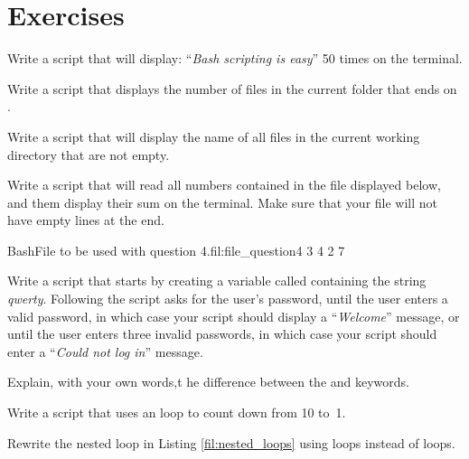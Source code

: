 \section*{Exercises}
\begin{exercises}
  \item Write a script that will display: ``\textit{Bash scripting is easy}'' 50 times on the terminal.
  \item Write a script that displays the number of files in the current folder that ends on .
  \item Write a script that will display the name of all  files in the current working directory that are not empty.
  \item Write a script that will read all numbers contained in the file displayed below, and them display their sum on the terminal. Make sure that your file will not have empty lines at the end.
  \begin{source_code_float}{Bash}{File to be used with question 4.}{fil:file_question4}
3
4
2
7
\end{source_code_float}
  \item Write a script that starts by creating a variable called  containing the string \textit{qwerty}. Following the script asks for the user's password, until the user enters a valid password, in which case your script should display a ``\textit{Welcome}'' message, or until the user enters three invalid passwords, in which case your script should enter a ``\textit{Could not log in}'' message.
   \item Explain, with your own words,t he difference between the  and  keywords.
  \item Write a script that uses an  loop to count down from 10 to~1.
  \item Rewrite the nested loop in Listing \ref{fil:nested_loops} using  loops instead of  loops.
\end{exercises}